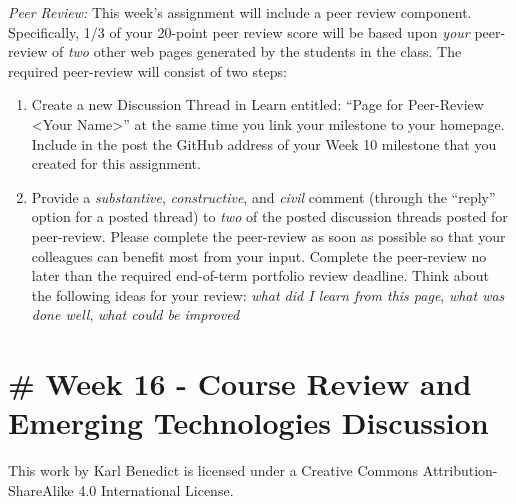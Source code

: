 \documentclass[]{book}
\begin{document}
\emph{Peer Review:} This week's assignment will include a peer review
component. Specifically, 1/3 of your 20-point peer review score will be
based upon \emph{your} peer-review of \emph{two} other web pages
generated by the students in the class. The required peer-review will
consist of two steps:

\begin{enumerate}
\def\labelenumi{\arabic{enumi}.}
\item
  Create a new Discussion Thread in Learn entitled: ``Page for
  Peer-Review \textless{}Your Name\textgreater{}'' at the same time you
  link your milestone to your homepage. Include in the post the GitHub
  address of your Week 10 milestone that you created for this
  assignment.
\item
  Provide a \emph{substantive}, \emph{constructive}, and \emph{civil}
  comment (through the ``reply'' option for a posted thread) to
  \emph{two} of the posted discussion threads posted for peer-review.
  Please complete the peer-review as soon as possible so that your
  colleagues can benefit most from your input. Complete the peer-review
  no later than the required end-of-term portfolio review deadline.
  Think about the following ideas for your review: \emph{what did I
  learn from this page}, \emph{what was done well}, \emph{what could be
  improved}
\end{enumerate}

\section{\# Week 16 - Course Review and Emerging Technologies
Discussion}\label{week-16---course-review-and-emerging-technologies-discussion}

This work by {Karl Benedict} is licensed under a Creative Commons
Attribution-ShareAlike 4.0 International License.
\end{document}
